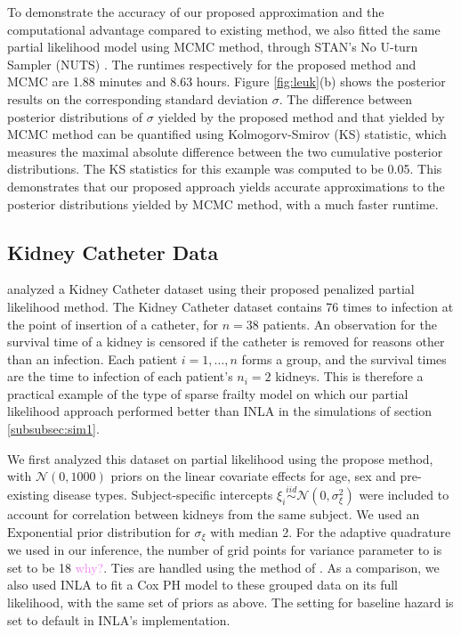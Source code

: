 \documentclass[ba]{imsart}
\newcommand{\alex}[1]{\textcolor{violet}{{ }#1}}
\begin{document}
To demonstrate the accuracy of our proposed approximation and the computational advantage compared to existing method, we also fitted the same partial likelihood model using MCMC method, through STAN's No U-turn Sampler (NUTS) \citep{NUTS}. The runtimes respectively for the proposed method and MCMC are 1.88 minutes and 8.63 hours. Figure \ref{fig:leuk}(b) shows the posterior results on the corresponding standard deviation $\sigma$. The difference between posterior distributions of $\sigma$ yielded by the proposed method and that yielded by MCMC method can be quantified using Kolmogorv-Smirov (KS) statistic, which measures the maximal absolute difference between the two cumulative posterior distributions. The KS statistics for this example was computed to be 0.05. This demonstrates that our proposed approach yields accurate approximations to the posterior distributions yielded by MCMC method, with a much faster runtime.




\subsection{Kidney Catheter Data}\label{subsec:kidney}

\cite{freqPL} analyzed a Kidney Catheter dataset using their proposed penalized partial likelihood method. The Kidney Catheter dataset contains 76 times to infection at the point of insertion of a catheter, for $n = 38$ patients. An observation for the survival time of a kidney is censored if the catheter is removed for reasons other than an infection.  Each patient $i=1,\ldots,n$ forms a group, and the survival times are the time to infection of each patient's $n_{i} = 2$ kidneys. This is therefore a practical example of the type of sparse frailty model on which our partial likelihood approach performed better than INLA in the simulations of section \ref{subsubsec:sim1}.

We first analyzed this dataset on partial likelihood using the propose method, with $\mathcal{N}(0, 1000)$ priors on the linear covariate effects for age, sex and pre-existing disease types. Subject-specific intercepts $\xi_{i}\overset{iid}{\sim}\mathcal{N}(0,\sigma^{2}_{\xi})$ were included to account for correlation between kidneys from the same subject. We used an $\text{Exponential}$ prior distribution for $\sigma_{\xi}$ with median 2. For the adaptive quadrature we used in our inference, the number of grid points for variance parameter to is set to be 18\alex{why?}. Ties are handled using the method of \cite{Breslow}.
As a comparison, we also used INLA to fit a Cox PH model to these grouped data on its full likelihood, with the same set of priors as above. The setting for baseline hazard is set to default in INLA's implementation.
\end{document}
